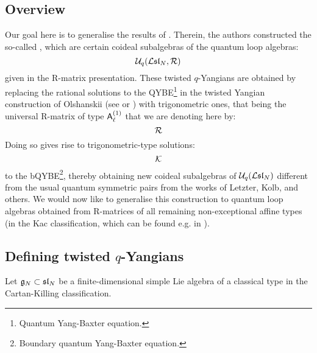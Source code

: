     \subsection{Overview}
        Our goal here is to generalise the results of \cite{molev_ragoucy_sorba_twisted_q_yangians_type_A}. Therein, the authors constructed the so-called , which are certain coideal subalgebras of the quantum loop algebras:
            $$\mathcal{U}_q(\mathcal{L}\mathfrak{sl}_N, \mathcal{R})$$
        given in the R-matrix presentation. These twisted $q$-Yangians are obtained by replacing the rational solutions to the QYBE\footnote{Quantum Yang-Baxter equation.} in the twisted Yangian construction of Olshanskii (see \cite{olshanski_twisted_yangians_and_infinite_dimensional_classical_lie_algebras} or \cite[Chapter 2]{molev_yangians_and_classical_lie_algebras}) with trigonometric ones, that being the universal R-matrix of type $\mathsf{A}_{\ell}^{(1)}$ that we are denoting here by: 
            $$\mathcal{R}$$
        Doing so gives rise to trigonometric-type solutions:
            $$\mathcal{K}$$
        to the bQYBE\footnote{Boundary quantum Yang-Baxter equation.}, thereby obtaining new coideal subalgebras of $\mathcal{U}_q(\mathcal{L}\mathfrak{sl}_N)$ different from the usual quantum symmetric pairs from the works of Letzter, Kolb, and others. We would now like to generalise this construction to quantum loop algebras obtained from R-matrices of all remaining non-exceptional affine types (in the Kac classification, which can be found e.g. in \cite[Chapter 4]{kac_infinite_dimensional_lie_algebras}). 

    \subsection{\texorpdfstring{Defining twisted $q$-Yangians}{}}
        Let $\mathfrak{g}_N \subset \mathfrak{sl}_N$ be a finite-dimensional simple Lie algebra of a classical type in the Cartan-Killing classification.
    
